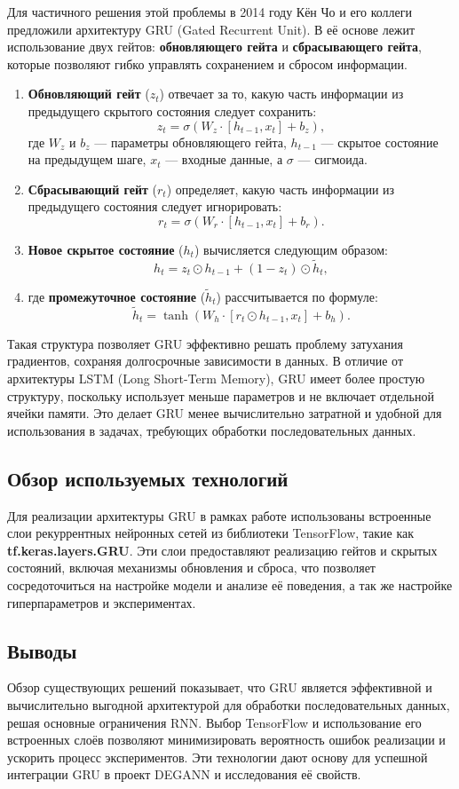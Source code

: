 Для частичного решения этой проблемы в 2014 году Кён Чо и его коллеги предложили архитектуру GRU (Gated Recurrent Unit). В её основе лежит использование двух гейтов: \textbf{обновляющего гейта} и \textbf{сбрасывающего гейта}, которые позволяют гибко управлять сохранением и сбросом информации.
\begin{enumerate}
\item \textbf{Обновляющий гейт} (\( z_t \)) отвечает за то, какую часть информации из предыдущего скрытого состояния следует сохранить:
  \[
  z_t = \sigma(W_z \cdot [h_{t-1}, x_t] + b_z),
  \]
  где \( W_z \) и \( b_z \) --- параметры обновляющего гейта, \( h_{t-1} \) --- скрытое состояние на предыдущем шаге, \( x_t \) --- входные данные, а \( \sigma \) --- сигмоида.

\item \textbf{Сбрасывающий гейт} (\( r_t \)) определяет, какую часть информации из предыдущего состояния следует игнорировать:
  \[
  r_t = \sigma(W_r \cdot [h_{t-1}, x_t] + b_r).
  \]

\item \textbf{Новое скрытое состояние} (\( h_t \)) вычисляется следующим образом:
\[
h_t = z_t \odot h_{t-1} + (1 - z_t) \odot \tilde{h}_t,
\]
\item где \textbf{промежуточное состояние} (\( \tilde{h}_t \)) рассчитывается по формуле:
\[
\tilde{h}_t = \tanh(W_h \cdot [r_t \odot h_{t-1}, x_t] + b_h).
\]
\end{enumerate}

Такая структура позволяет GRU эффективно решать проблему затухания градиентов, сохраняя долгосрочные зависимости в данных. В отличие от архитектуры LSTM (Long Short-Term Memory), GRU имеет более простую структуру, поскольку использует меньше параметров и не включает отдельной ячейки памяти. Это делает GRU менее вычислительно затратной и удобной для использования в задачах, требующих обработки последовательных данных.

\subsection{Обзор используемых технологий}
Для реализации архитектуры GRU в рамках работе использованы встроенные слои рекуррентных нейронных сетей из библиотеки TensorFlow, такие как \textbf{tf.keras.layers.GRU}. Эти слои предоставляют реализацию гейтов и скрытых состояний, включая механизмы обновления и сброса, что позволяет сосредоточиться на настройке модели и анализе её поведения, а так же настройке гиперпараметров и экспериментах.

\subsection{Выводы}

Обзор существующих решений показывает, что GRU является эффективной и вычислительно выгодной архитектурой для обработки последовательных данных, решая основные ограничения RNN. Выбор TensorFlow и использование его встроенных слоёв позволяют минимизировать вероятность ошибок реализации и ускорить процесс экспериментов. Эти технологии дают основу для успешной интеграции GRU в проект DEGANN и исследования её свойств.
